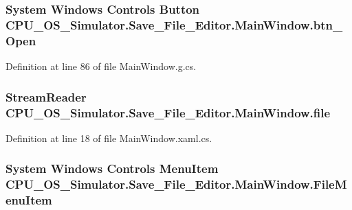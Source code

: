 \subsubsection[{btn\+\_\+\+Open}]{\setlength{\rightskip}{0pt plus 5cm}System Windows Controls Button C\+P\+U\+\_\+\+O\+S\+\_\+\+Simulator.\+Save\+\_\+\+File\+\_\+\+Editor.\+Main\+Window.\+btn\+\_\+\+Open\hspace{0.3cm}{\ttfamily [package]}}\label{class_c_p_u___o_s___simulator_1_1_save___file___editor_1_1_main_window_a353c2ed525a145ca1034f96605ffeb73}


Definition at line 86 of file Main\+Window.\+g.\+cs.

\hypertarget{class_c_p_u___o_s___simulator_1_1_save___file___editor_1_1_main_window_a991061ea935a2bd7571b32b5b2cce64d}{}
\subsubsection[{file}]{\setlength{\rightskip}{0pt plus 5cm}Stream\+Reader C\+P\+U\+\_\+\+O\+S\+\_\+\+Simulator.\+Save\+\_\+\+File\+\_\+\+Editor.\+Main\+Window.\+file\hspace{0.3cm}{\ttfamily [private]}}\label{class_c_p_u___o_s___simulator_1_1_save___file___editor_1_1_main_window_a991061ea935a2bd7571b32b5b2cce64d}


Definition at line 18 of file Main\+Window.\+xaml.\+cs.

\hypertarget{class_c_p_u___o_s___simulator_1_1_save___file___editor_1_1_main_window_af4c6dfeaa4a5e61edfc6999c20789e51}{}
\subsubsection[{File\+Menu\+Item}]{\setlength{\rightskip}{0pt plus 5cm}System Windows Controls Menu\+Item C\+P\+U\+\_\+\+O\+S\+\_\+\+Simulator.\+Save\+\_\+\+File\+\_\+\+Editor.\+Main\+Window.\+File\+Menu\+Item\hspace{0.3cm}{\ttfamily [package]}}\label{class_c_p_u___o_s___simulator_1_1_save___file___editor_1_1_main_window_af4c6dfeaa4a5e61edfc6999c20789e51}


